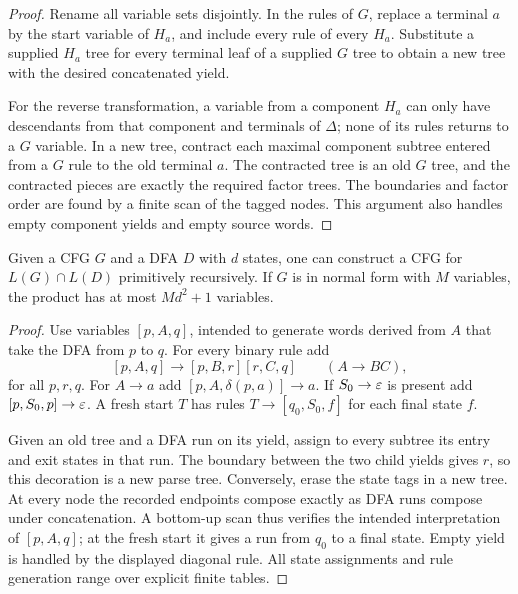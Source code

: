 \begin{proof}
Rename all variable sets disjointly.  In the rules of $G$, replace a terminal
$a$ by the start variable of $H_a$, and include every rule of every $H_a$.
Substitute a supplied $H_a$ tree for every terminal leaf of a supplied $G$
tree to obtain a new tree with the desired concatenated yield.

For the reverse transformation, a variable from a component $H_a$ can
only have descendants from that component and terminals of $\Delta$;
none of its rules returns to a $G$ variable.  In a new tree, contract each
maximal component subtree entered from a $G$ rule to the old terminal $a$.
The contracted tree is an old $G$ tree, and the contracted pieces are
exactly the required factor trees.  The boundaries and factor order are
found by a finite scan of the tagged nodes.  This argument also handles
empty component yields and empty source words.
\end{proof}

\begin{theorem}
\label{cf:regular-intersection}
Given a CFG $G$ and a DFA $D$ with $d$ states, one can construct a CFG for
$L(G)\cap L(D)$ primitively recursively.  If $G$ is in normal form with
$M$ variables, the product has at most $Md^2+1$ variables.
\end{theorem}

\begin{proof}
Use variables $[p,A,q]$, intended to generate words derived from $A$ that
take the DFA from $p$ to $q$.  For every binary rule add
\[
 [p,A,q]\to[p,B,r][r,C,q]\qquad(A\to BC),
\]
for all $p,r,q$.  For $A\to a$ add
$[p,A,\delta(p,a)]\to a$.  If $S_0\to\varepsilon$ is present add
$[p,S_0,p]\to\varepsilon$.  A fresh start $T$ has rules
$T\to[q_0,S_0,f]$ for each final state $f$.

Given an old tree and a DFA run on its yield, assign to every subtree its
entry and exit states in that run.  The boundary between the two child
yields gives $r$, so this decoration is a new parse tree.  Conversely,
erase the state tags in a new tree.  At every node the recorded endpoints
compose exactly as DFA runs compose under concatenation.  A bottom-up
scan thus verifies the intended interpretation of $[p,A,q]$; at the fresh
start it gives a run from $q_0$ to a final state.  Empty yield is handled
by the displayed diagonal rule.  All state assignments and rule generation
range over explicit finite tables.
\end{proof}

